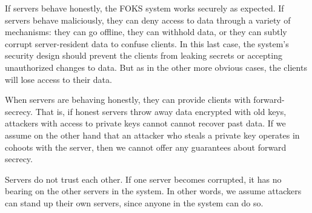 If servers behave honestly, the FOKS system works securely as expected.  If
servers behave maliciously, they can deny access to data through a variety of
mechanisms: they can go offline, they can withhold data, or they can subtly
corrupt server-resident data to confuse clients. In this last case, the system's
security design should prevent the clients from leaking secrets or accepting
unauthorized changes to data. But as in the other more obvious cases, the
clients will lose access to their data.

When servers are behaving honestly, they can provide clients with
forward-secrecy. That is, if honest servers throw away data encrypted with old
keys, attackers with access to private keys cannot cannot recover past data.  If
we assume on the other hand that an attacker who steals a private key operates
in cohoots with the server, then we cannot offer any guarantees about forward
secrecy.

Servers do not trust each other. If one server becomes corrupted, it has no
bearing on the other servers in the system. In other words, we assume attackers
can stand up their own servers, since anyone in the system can do so.

